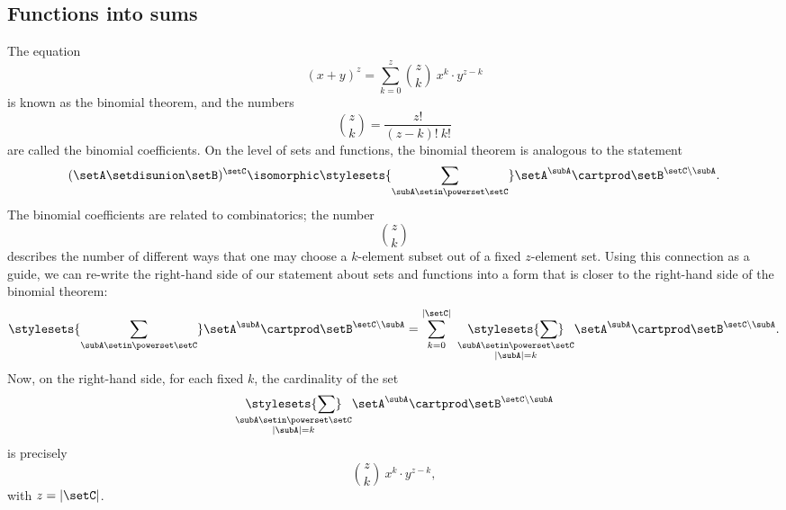 

\subsection{Functions into sums}

The equation 
\begin{equation}
(x + y)^z = \sum_{k = 0}^z {{z}\choose{k}} \ x^k \cdot y^{z - k}
\end{equation}
is known as the binomial theorem, and the numbers
\begin{equation}
{{z}\choose{k}} = \frac{z!}{(z-k)! \ k!}
\end{equation}
are called the binomial coefficients. On the level of sets and functions, the binomial theorem is analogous to the statement
\begin{equation}
(\setA \setdisunion \setB)^{\setC}  \isomorphic \stylesets{\sum_{\subA \setin \powerset \setC}} \setA^\subA \cartprod \setB^{\setC \backslash \subA}.
\end{equation}
The binomial coefficients are related to combinatorics; the number
\begin{equation}
{{z}\choose{k}}
\end{equation}
describes the number of different ways that one may choose a $k$-element subset out of a fixed $z$-element set. Using this connection as a guide, we can re-write the right-hand side of our statement about sets and functions into a form that is closer to the right-hand side of the binomial theorem: 
\begin{equation}
\stylesets{\sum_{\subA \setin \powerset \setC}} \setA^\subA \cartprod \setB^{\setC \backslash \subA} = \sum_{k = 0}^{\vert \setC \vert} \ \underset{\substack{\subA \setin \powerset \setC \\ \vert \subA \vert = k}}{\stylesets{\sum}} \setA^\subA \cartprod \setB^{\setC \backslash \subA}.
\end{equation}
Now, on the right-hand side, for each fixed $k$, the cardinality of the set 
\begin{equation}
\underset{\substack{\subA \setin \powerset \setC \\ \vert \subA \vert = k}}{\stylesets{\sum}} \setA^\subA \cartprod \setB^{\setC \backslash \subA}
\end{equation}
is precisely 
\begin{equation}
{{z}\choose{k}} \ x^k \cdot y^{z - k},
\end{equation}
with $z = \vert \setC \vert$. 



